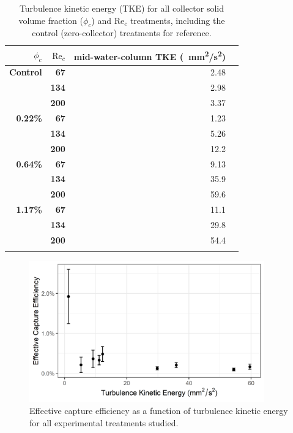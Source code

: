 \documentclass[geosciences,article,submit,moreauthors,pdftex]{Definitions/mdpi}
\newcommand\Rey{\mathrm{Re}}
\begin{document}
\begin{table}[H]
\caption{Turbulence kinetic energy (TKE) for all collector solid volume fraction ($\phi_c$) and $\Rey_c$ treatments, including the control (zero-collector) treatments for reference.}
\centering
\begin{tabular}{>{\bfseries}r>{\bfseries}rrr}
\toprule
\textbf{$\phi_c$}&\textbf{$\Rey_c$}&\textbf{mid-water-column TKE (\SI{}{\milli\metre^2/\second^2})}\\
\midrule
Control &   67  & \num{2.48}\\
        &   134 & \num{2.98}\\
        &   200 & \num{3.37}\\
\midrule
0.22\% &   67  & \num{1.23}\\
        &   134 & \num{5.26}\\
        &   200 & \num{12.2}\\
\midrule
0.64\% &   67  & \num{9.13}\\
        &   134 & \num{35.9}\\
        &   200 & \num{59.6}\\
\midrule
1.17\%  &   67  & \num{11.1}\\
        &   134 & \num{29.8}\\
        &   200 & \num{54.4}\\
\bottomrule
\label{tbl:turbulence}
\end{tabular}
\end{table}

\begin{figure}[H]
\centering
\includegraphics[width=4in]{../pics/tke.png}
\caption{Effective capture efficiency as a function of turbulence kinetic energy for all experimental treatments studied.}
\label{fig:tke}
\end{figure}   
\end{document}
